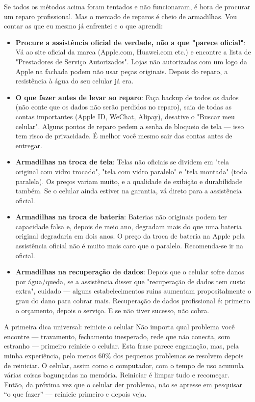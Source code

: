 
Se todos os métodos acima foram tentados e não funcionaram, é hora de procurar um reparo profissional. Mas o mercado de reparos é cheio de armadilhas. Vou contar as que eu mesmo já enfrentei e o que aprendi:

\begin{itemize}
  \item \textbf{Procure a assistência oficial de verdade, não a que "parece oficial"}: Vá ao site oficial da marca (Apple.com, Huawei.com etc.) e encontre a lista de "Prestadores de Serviço Autorizados". Lojas não autorizadas com um logo da Apple na fachada podem não usar peças originais. Depois do reparo, a resistência à água do seu celular já era.
  \item \textbf{O que fazer antes de levar ao reparo}: Faça backup de todos os dados (não conte que os dados não serão perdidos no reparo), saia de todas as contas importantes (Apple ID, WeChat, Alipay), desative o "Buscar meu celular". Alguns pontos de reparo pedem a senha de bloqueio de tela — isso tem risco de privacidade. É melhor você mesmo sair das contas antes de entregar.
  \item \textbf{Armadilhas na troca de tela}: Telas não oficiais se dividem em "tela original com vidro trocado", "tela com vidro paralelo" e "tela montada" (toda paralela). Os preços variam muito, e a qualidade de exibição e durabilidade também. Se o celular ainda estiver na garantia, vá direto para a assistência oficial.
  \item \textbf{Armadilhas na troca de bateria}: Baterias não originais podem ter capacidade falsa e, depois de meio ano, degradam mais do que uma bateria original degradaria em dois anos. O preço da troca de bateria na Apple pela assistência oficial não é muito mais caro que o paralelo. Recomenda-se ir na oficial.
  \item \textbf{Armadilhas na recuperação de dados}: Depois que o celular sofre danos por água/queda, se a assistência disser que "recuperação de dados tem custo extra", cuidado — alguns estabelecimentos ruins aumentam propositalmente o grau do dano para cobrar mais. Recuperação de dados profissional é: primeiro o orçamento, depois o serviço. E se não tiver sucesso, não cobra.
\end{itemize}

\begin{tcbwarn}{A primeira dica universal: reinicie o celular}
Não importa qual problema você encontre — travamento, fechamento inesperado, rede que não conecta, som estranho — primeiro reinicie o celular. Esta frase parece enganação, mas, pela minha experiência, pelo menos 60\% dos pequenos problemas se resolvem depois de reiniciar. O celular, assim como o computador, com o tempo de uso acumula várias coisas bagunçadas na memória. Reiniciar é limpar tudo e recomeçar. Então, da próxima vez que o celular der problema, não se apresse em pesquisar “o que fazer” — reinicie primeiro e depois veja.

\end{tcbwarn}


